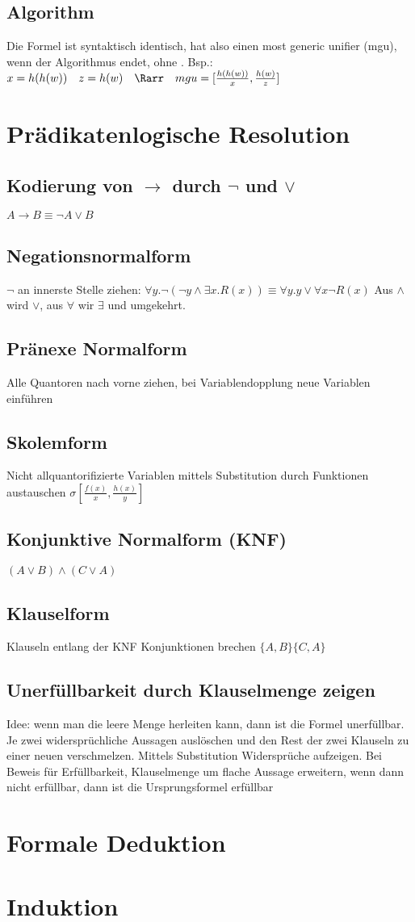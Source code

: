 \documentclass{article}
\begin{document}
		\subsection{Algorithm}
			Die Formel ist syntaktisch identisch, hat also einen most generic unifier (mgu), wenn der Algorithmus endet, ohne \bot. \newline
			Bsp.: $x=h(h(w)) \quad z = h(w) \quad \Rarr \quad mgu = [\frac{h(h(w))}{x}, \frac{h(w)}{z}]$
	\section{Prädikatenlogische Resolution}
		\subsection{Kodierung von $\to$ durch $\lnot$ und $\lor$}
			$A\to B \equiv \lnot A \lor B$
		\subsection{Negationsnormalform}
			$\lnot$ an innerste Stelle ziehen: \newline
			$\forall y.\lnot(\lnot y \land \exists x. R(x))\equiv \forall y.y \lor \forall x \lnot R(x)$ \newline
			Aus $\land$ wird $\lor$, aus $\forall$ wir $\exists$ und umgekehrt. 
		\subsection{Pränexe Normalform}
			Alle Quantoren nach vorne ziehen, bei Variablendopplung neue Variablen einführen
		\subsection{Skolemform}
			Nicht allquantorifizierte Variablen mittels Substitution durch Funktionen austauschen 
			$\sigma[\frac{f(x)}{x}, \frac{h(x)}{y}]$
		\subsection{Konjunktive Normalform (KNF)}
			$(A\lor B)\land (C \lor A)$	
		\subsection{Klauselform}
			Klauseln entlang der KNF Konjunktionen brechen \newline
			$\{A, B\}\{C, A\}$
		\subsection{Unerfüllbarkeit durch Klauselmenge zeigen}
			Idee: wenn man die leere Menge herleiten kann, dann ist die Formel unerfüllbar. \newline
			Je zwei widersprüchliche Aussagen auslöschen und den Rest der zwei Klauseln zu einer neuen verschmelzen. Mittels Substitution Widersprüche aufzeigen. \newline
			Bei Beweis für Erfüllbarkeit, Klauselmenge um flache Aussage erweitern, wenn dann nicht erfüllbar, dann ist die Ursprungsformel erfüllbar
	\section{Formale Deduktion}
	\section{Induktion}
\end{document}
